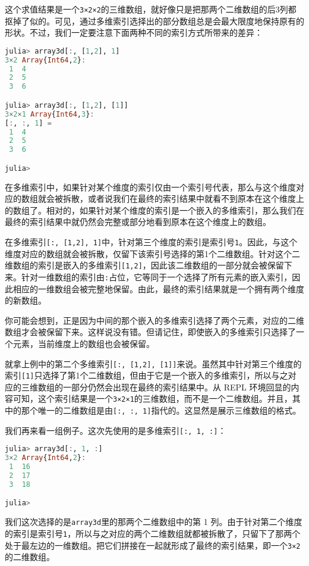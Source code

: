 这个求值结果是一个\verb|3×2×2|的三维数组，就好像只是把那两个二维数组的后3列都抠掉了似的。可见，通过多维索引选择出的部分数组总是会最大限度地保持原有的形状。不过，我们一定要注意下面两种不同的索引方式所带来的差异：

\begin{lstlisting}[language=julia]
julia> array3d[:, [1,2], 1]
3×2 Array{Int64,2}:
 1  4
 2  5
 3  6

julia> array3d[:, [1,2], [1]]
3×2×1 Array{Int64,3}:
[:, :, 1] =
 1  4
 2  5
 3  6

julia> 
\end{lstlisting}

在多维索引中，如果针对某个维度的索引仅由一个索引号代表，那么与这个维度对应的数组就会被拆散，或者说我们在最终的索引结果中就看不到原本在这个维度上的数组了。相对的，如果针对某个维度的索引是一个嵌入的多维索引，那么我们在最终的索引结果中就仍然会完整或部分地看到原本在这个维度上的数组。

在多维索引\verb|[:, [1,2], 1]|中，针对第三个维度的索引是索引号\verb|1|。因此，与这个维度对应的数组就会被拆散，仅留下该索引号选择的第1个二维数组。针对这个二维数组的索引是嵌入的多维索引\verb|[1,2]|，因此该二维数组的一部分就会被保留下来。针对一维数组的索引由\verb|:|占位，它等同于一个选择了所有元素的嵌入索引，因此相应的一维数组会被完整地保留。由此，最终的索引结果就是一个拥有两个维度的新数组。

你可能会想到，正是因为中间的那个嵌入的多维索引选择了两个元素，对应的二维数组才会被保留下来。这样说没有错。但请记住，即使嵌入的多维索引只选择了一个元素，当前维度上的数组也会被保留。

就拿上例中的第二个多维索引\verb|[:, [1,2], [1]]|来说。虽然其中针对第三个维度的索引\verb|[1]|只选择了第1个二维数组，但由于它是一个嵌入的多维索引，所以与之对应的三维数组的一部分仍然会出现在最终的索引结果中。从 REPL 环境回显的内容可知，这个索引结果是一个\verb|3×2×1|的三维数组，而不是一个二维数组。并且，其中的那个唯一的二维数组是由\verb|[:, :, 1]|指代的。这显然是展示三维数组的格式。

我们再来看一组例子。这次先使用的是多维索引\verb|[:, 1, :]|：

\begin{lstlisting}[language=julia]
julia> array3d[:, 1, :]
3×2 Array{Int64,2}:
 1  16
 2  17
 3  18

julia> 
\end{lstlisting}

我们这次选择的是\verb|array3d|里的那两个二维数组中的第 1 列。由于针对第二个维度的索引是索引号\verb|1|，所以与之对应的两个二维数组就都被拆散了，只留下了那两个处于最左边的一维数组。把它们拼接在一起就形成了最终的索引结果，即一个\verb|3×2|的二维数组。

